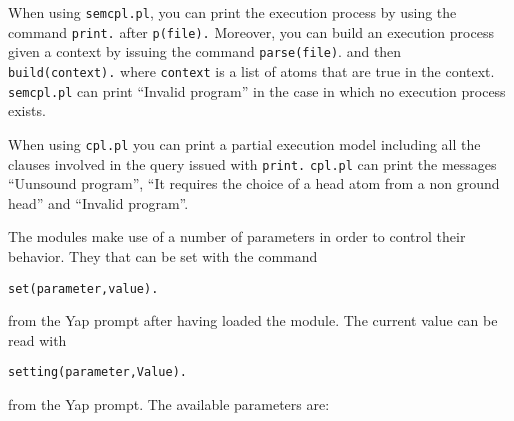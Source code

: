 \documentclass[a4paper,12pt]{article}
\begin{document}
When using \texttt{semcpl.pl}, you can print the execution process by using the command \texttt{print.}
after \texttt{p(file).} Moreover, you can build an execution process given a context by issuing the command \texttt{parse(file)}. and then
\texttt{build(context).} where \texttt{context} is a list of atoms that are true in the context.
\texttt{semcpl.pl}  can print ``Invalid program'' in the case in which no execution process exists. 

When using \texttt{cpl.pl} you can print a partial execution model including all the clauses involved in the query issued with \texttt{print.} \texttt{cpl.pl} can print the messages ``Uunsound program'', ``It requires the choice of a head atom from a non ground head'' and ``Invalid program''.


The modules make use of a number of parameters in order to control their behavior. They that can be set with the command
\begin{verbatim}
set(parameter,value).
\end{verbatim}
from the Yap prompt after having loaded the module.
The current value can be read with
\begin{verbatim}
setting(parameter,Value).
\end{verbatim}
from the Yap prompt.
The available parameters are:
\end{document}
